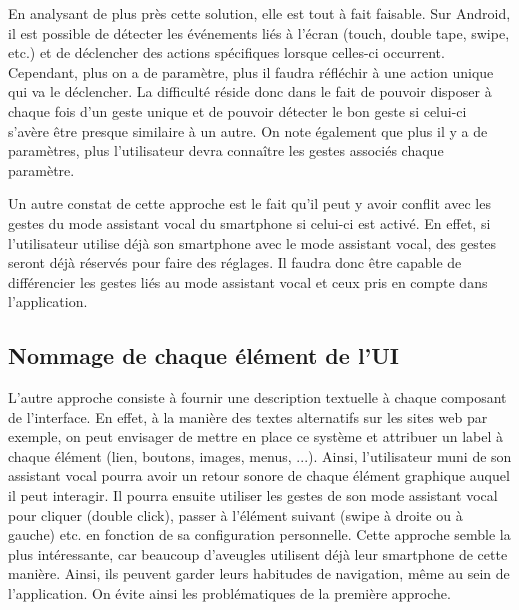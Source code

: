 \documentclass[UTF8]{EPURapport}
\begin{document}
En analysant de plus près cette solution, elle est tout à fait faisable. Sur Android, il est possible de détecter les événements liés à l'écran (touch, double tape, swipe, etc.) et de déclencher des actions spécifiques lorsque celles-ci occurrent. Cependant, plus on a de paramètre, plus il faudra réfléchir à une action unique qui va le déclencher. La difficulté réside donc dans le fait de pouvoir disposer à chaque fois d'un geste unique et de pouvoir détecter le bon geste si celui-ci s'avère être presque similaire à un autre. On note également que plus il y a de paramètres, plus l'utilisateur devra connaître les gestes associés chaque paramètre.\

Un autre constat de cette approche est le fait qu'il peut y avoir conflit avec les gestes du mode assistant vocal du smartphone si celui-ci est activé. En effet, si l'utilisateur utilise déjà son smartphone avec le mode assistant vocal, des gestes seront déjà réservés pour faire des réglages. Il faudra donc être capable de différencier les gestes liés au mode assistant vocal et ceux pris en compte dans l'application.

\subsection{Nommage de chaque élément de l'UI}
L'autre approche consiste à fournir une description textuelle à chaque composant de l'interface. En effet, à la manière des textes alternatifs sur les sites web par exemple, on peut envisager de mettre en place ce système et attribuer un label à chaque élément (lien, boutons, images, menus, ...). Ainsi, l'utilisateur muni de son assistant vocal pourra avoir un retour sonore de chaque élément graphique auquel il peut interagir. Il pourra ensuite utiliser les gestes de son mode assistant vocal pour cliquer (double click), passer à l'élément suivant (swipe à droite ou à gauche) etc. en fonction de sa configuration personnelle. Cette approche semble la plus intéressante, car beaucoup d'aveugles utilisent déjà leur smartphone de cette manière. Ainsi, ils peuvent garder leurs habitudes de navigation, même au sein de l'application. On évite ainsi les problématiques de la première approche.

\annexes
\end{document}
